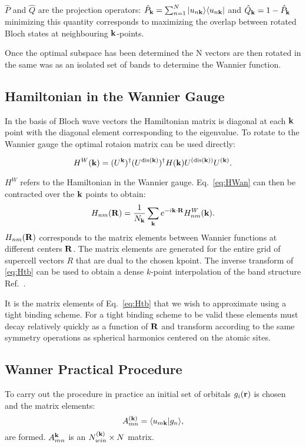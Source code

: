 $\hat{P}$ and $\hat{Q}$ are the projection operators: 
$\hat{P}_{{\bf k}}=\sum_{n=1}^{N}|u_{n{\bf k}}\rangle \langle u_{n{\bf k}}|$ and $\hat{Q}_{{\bf k}} = 1-\hat{P}_{{\bf k}}$
minimizing this quantity corresponds to maximizing the overlap between rotated Bloch
states at neighbouring ${\bf k}$-points.

Once the optimal subspace has been determined the N vectors are then rotated in the same
was as an isolated set of bands to determine the Wannier function.

\subsection{Hamiltonian in the Wannier Gauge}
In the basis of Bloch wave vectors the Hamiltonian matrix is diagonal at each ${\bf k}$ point
with the diagonal element corresponding to the eigenvalue. To rotate to the 
Wannier gauge the optimal rotaion matrix can be used directly:

\begin{equation}
\label{eq:HWan}
H^{W}({\bf k}) = (U^{{\bf k}})^{\dagger}(U^{{\rm dis}({\bf k})})^{\dagger}H({\bf k})U^{({\rm dis}({\bf k}))}U^{({\bf k})}.
\end{equation}

$H^{W}$ refers to the Hamiltonian in the Wannier gauge. Eq.~\ref{eq:HWan} can then be contracted
over the ${\bf k}$ points to obtain:
%
\begin{equation}
\label{eq:Htb}
H_{nm}({\bf R}) = \frac{1}{N_{{\bf k}}} \sum_{{\bf k}} e^{-i{\bf k}\cdot{\bf R}}H_{nm}^{W}({\bf k}).
\end{equation}
%
$H_{nm}({\bf R})$ corresponds to the matrix elements between Wannier functions at different centers ${\bf R}$. 
The matrix elements are generated for the entire grid of supercell vectors $R$ that
are dual to the chosen kpoint. The inverse transform of \ref{eq:Htb} can be used to obtain a
dense $k$-point interpolation of the band structure Ref.~\cite{yates07}.

It is the matrix elements of Eq.~\ref{eq:Htb} that we wish to approximate using a tight binding scheme.
For a tight binding scheme to be valid these elements must decay relatively quickly 
as a function of ${\bf R}$ and transform according to the same symmetry operations as spherical harmonics
centered on the atomic sites. 

\subsection{Wanner Practical Procedure}
To carry out the procedure in practice an initial set of orbitals 
${g_{i}({\bf r})}$ is chosen and the matrix elements:
%
\begin{equation}
\label{eq:overlap}
A^{({\bf k})}_{mn} = \langle u_{m{\bf k}}|g_{n} \rangle,
\end{equation}
%
are formed. $A^{{\bf k}}_{mn}$ is an $N^{({\bf k})}_{win} \times N$ matrix. 

